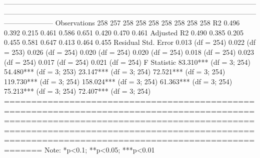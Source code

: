 ---------------------------------------------------------------------------------------------------------------------------------------------------------------------------------------------------------------------------------------------
Observations                  258                     257                     258                     258                     258                      258                      258                     258                     258          
R2                           0.496                   0.392                   0.215                   0.461                   0.586                    0.651                    0.420                   0.470                   0.461         
Adjusted R2                  0.490                   0.385                   0.205                   0.455                   0.581                    0.647                    0.413                   0.464                   0.455         
Residual Std. Error    0.013 (df = 254)        0.022 (df = 253)        0.026 (df = 254)        0.020 (df = 254)         0.020 (df = 254)         0.018 (df = 254)        0.023 (df = 254)        0.017 (df = 254)        0.021 (df = 254)    
F Statistic         83.310*** (df = 3; 254) 54.480*** (df = 3; 253) 23.147*** (df = 3; 254) 72.521*** (df = 3; 254) 119.730*** (df = 3; 254) 158.024*** (df = 3; 254) 61.363*** (df = 3; 254) 75.213*** (df = 3; 254) 72.407*** (df = 3; 254)
=============================================================================================================================================================================================================================================
Note:                                                                                                                                                                                                             *p<0.1; **p<0.05; ***p<0.01

